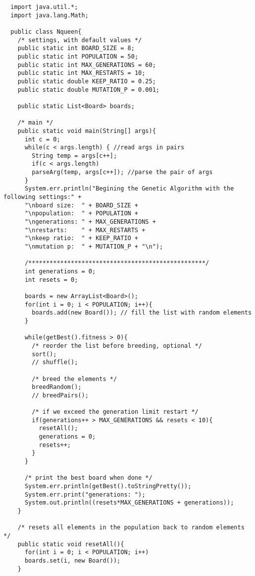 \documentclass[a4paper,11pt]{article}
\begin{document}
\begin{lstlisting}
  import java.util.*;
  import java.lang.Math;
  
  public class Nqueen{
    /* settings, with default values */
    public static int BOARD_SIZE = 8;
    public static int POPULATION = 50;
    public static int MAX_GENERATIONS = 60;
    public static int MAX_RESTARTS = 10;
    public static double KEEP_RATIO = 0.25;
    public static double MUTATION_P = 0.001;

    public static List<Board> boards;

    /* main */
    public static void main(String[] args){
      int c = 0;
      while(c < args.length) { //read args in pairs
        String temp = args[c++];
        if(c < args.length)
        parseArg(temp, args[c++]); //parse the pair of args
      }
      System.err.println("Begining the Genetic Algorithm with the following settings:" +
      "\nboard size:  " + BOARD_SIZE +
      "\npopulation:  " + POPULATION +
      "\ngenerations: " + MAX_GENERATIONS +
      "\nrestarts:    " + MAX_RESTARTS +
      "\nkeep ratio:  " + KEEP_RATIO +
      "\nmutation p:  " + MUTATION_P + "\n");        

      /**************************************************/
      int generations = 0;
      int resets = 0;
      
      boards = new ArrayList<Board>();
      for(int i = 0; i < POPULATION; i++){
        boards.add(new Board()); // fill the list with random elements
      }
      
      while(getBest().fitness > 0){
        /* reorder the list before breeding, optional */
        sort();
        // shuffle();

        /* breed the elements */
        breedRandom();
        // breedPairs();

        /* if we exceed the generation limit restart */
        if(generations++ > MAX_GENERATIONS && resets < 10){ 
          resetAll();
          generations = 0;
          resets++;
        }
      }

      /* print the best board when done */
      System.err.println(getBest().toStringPretty());
      System.err.print("generations: ");
      System.out.println((resets*MAX_GENERATIONS + generations));
    }

    /* resets all elements in the population back to random elements */
    public static void resetAll(){
      for(int i = 0; i < POPULATION; i++)
      boards.set(i, new Board());
    }


\end{lstlisting}
\end{document}
